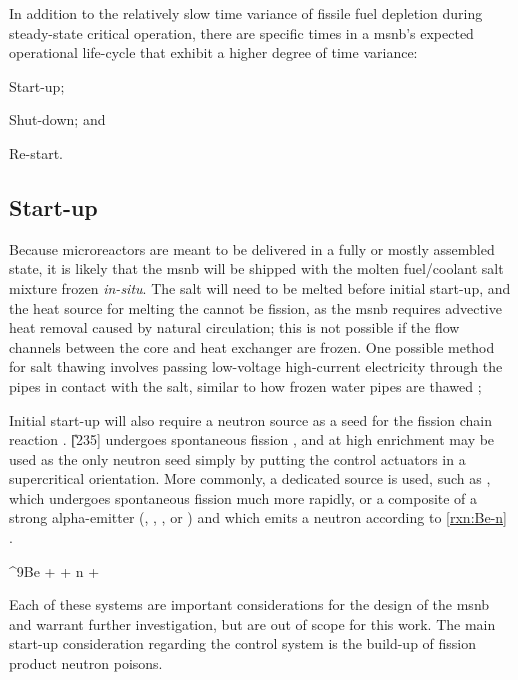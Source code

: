 In addition to the relatively slow time variance of fissile fuel depletion during steady-state critical operation, there are specific times in a \acs{msnb}'s expected operational life-cycle that exhibit a higher degree of time variance: 
\begin{enumerate*}
\item Start-up; \item Shut-down; and \item Re-start.
\end{enumerate*}

\subsection{Start-up}
Because microreactors are meant to be delivered in a fully or mostly assembled state, it is likely that the \acs{msnb} will be shipped with the molten fuel/coolant salt mixture frozen \textit{in-situ}. The salt will need to be melted before initial start-up, and the heat source for melting the cannot be fission, as the \acs{msnb} requires advective heat removal caused by natural circulation; this is not possible if the flow channels between the core and heat exchanger are frozen. One possible method for salt thawing involves passing low-voltage high-current electricity through the pipes in contact with the salt, similar to how frozen water pipes are thawed \cite{Thawing};

Initial start-up will also require a neutron source as a seed for the fission chain reaction \cite[Ch. 2]{DH}. \U[235] undergoes spontaneous fission \cite[Ch. 6]{Faw}, and at high enrichment may be used as the only neutron seed simply by putting the control actuators in a supercritical orientation. More commonly, a dedicated source is used, such as \Ca[252], which undergoes spontaneous fission much more rapidly, or a composite of a strong alpha-emitter (\eg \Pu[238], \Am[241], \Po[210], or \Ra[226]) and \Be[9] which emits a neutron according to \ref{rxn:Be-n} \cite[Ch. 2]{Handbook}.

\begin{reaction}\label{rxn:Be-n}
    ^{9}Be + \alpha {} + n + \gamma
\end{reaction}

Each of these systems are important considerations for the design of the \acs{msnb} and warrant further investigation, but are out of scope for this work. The main start-up consideration regarding the control system is the build-up of fission product neutron poisons.

